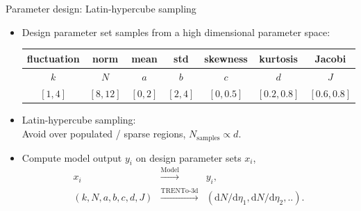 \documentclass[11pt]{beamer}
\begin{document}
\begin{frame}{Parameter design: Latin-hypercube sampling}
\begin{itemize}
\item Design parameter set samples from a high dimensional parameter space:
\begin{center}
\begin{tabular}{ccccccc}
\hline
fluctuation & norm  & 	mean	 	&	std   	&	skewness		&	kurtosis	 & Jacobi	\\
\hline
$k$ & $N$ & $a$ & $b$ & $c$ & $d$ & $J$ \\
$[1,4]$ & $[8,12]$ & $[0,2]$ & $[2,4]$ & $[0, 0.5]$ & $[0.2, 0.8]$ & $[0.6, 0.8]$\\
\hline
\end{tabular}
\end{center}
\item Latin-hypercube sampling: \\ Avoid over populated / sparse regions, $N_{\textrm{samples}} \propto d$.
\item Compute model output $y_i$ on design parameter sets $x_i$,
\begin{eqnarray}
\nonumber
x_i &\xrightarrow{\textrm{Model}}& y_i,\\
\nonumber
(k, N, a, b, c, d, J) &\xrightarrow{\textrm{TRENTo-3d}}& (\mathrm{d}N/\mathrm{d}\eta_1, \mathrm{d}N/\mathrm{d}\eta_2, ..).
\end{eqnarray}
\end{itemize}
\end{frame}
\end{document}
